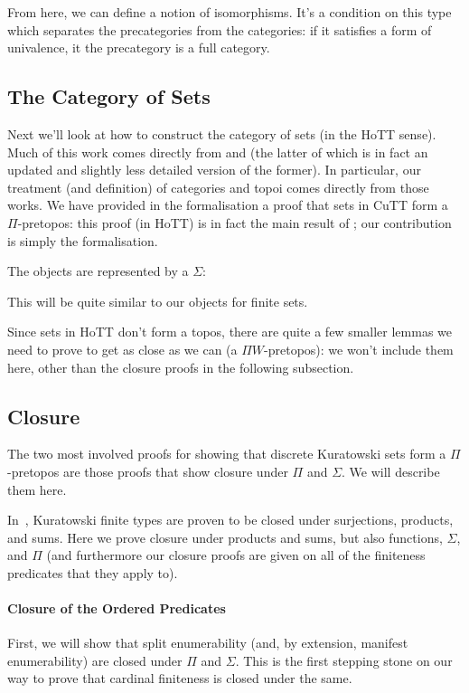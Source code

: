 From here, we can define a notion of isomorphisms.
It's a condition on this type which separates the precategories from the
categories: if it satisfies a form of univalence, it the precategory is a full
category.

\subsection{The Category of Sets}
Next we'll look at how to construct the category of sets (in the HoTT sense).
Much of this work comes directly from \citet{rijkeSetsHomotopyType2015} and
\citet[section 10]{hottbook} (the latter of which is in fact an updated and
slightly less detailed version of the former).
In particular, our treatment (and definition) of categories and topoi comes
directly from those works.
We have provided in the formalisation a proof that sets in CuTT form a
\(\Pi\)-pretopos: this proof (in HoTT) is in fact the main result of
\citet{rijkeSetsHomotopyType2015}; our contribution is simply the formalisation.

The objects are represented by a \(\Sigma\):


This will be quite similar to our objects for finite sets.

Since sets in HoTT don't form a topos, there are quite a few smaller lemmas we
need to prove to get as close as we can (a \(\Pi W\)-pretopos): we won't include
them here, other than the closure proofs in the following subsection.
\subsection{Closure}
The two most involved proofs for showing that discrete Kuratowski sets form a
\(\Pi\)-pretopos are those proofs that show closure under \(\Pi\) and
\(\Sigma\).
We will describe them here.

In~\citet[Theorem 4.21]{fruminFiniteSetsHomotopy2018}, Kuratowski finite types
are proven to be closed under surjections, products, and sums.
Here we prove closure under products and sums, but also functions, \(\Sigma\),
and \(\Pi\) (and furthermore our closure proofs are given on all of the
finiteness predicates that they apply to).

\paragraph{Closure of the Ordered Predicates}
First, we will show that split enumerability (and, by extension, manifest
enumerability) are closed under \(\Pi\) and \(\Sigma\).
This is the first stepping stone on our way to prove that cardinal finiteness is
closed under the same.

